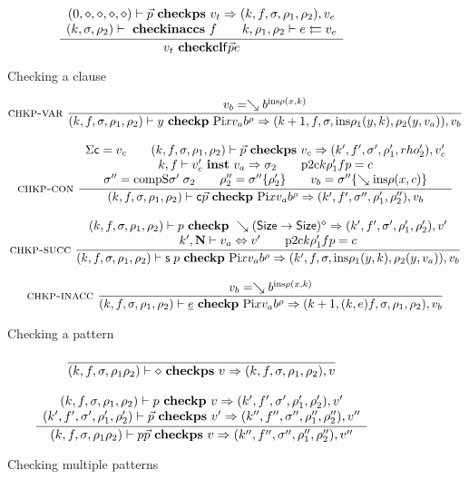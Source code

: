 \begin{figure}
\begin{gather*}
\ \dfrac{\begin{array}[b]{c}(0,\diamond,\diamond,\diamond,\diamond)\vdash\vec{p}\mbox{ \textbf{checkps} }v_t\Rightarrow (k,f,\sigma,\rho_1,\rho_2),v_e\\(k,\sigma,\rho_2)\vdash\mbox{ \textbf{checkinaccs} }f 
\qquad
k,\rho_1,\rho_2\vdash e\leftleftarrows v_e
\end{array}}{
v_t\mbox{ \textbf{checkcl}}\mathsf{f} \vec{p} e
}
\end{gather*}
\caption{Checking a clause}
\end{figure}

\begin{figure}
\begin{gather*}
\mbox{\sc chkp-var}\ \dfrac{v_b = \searrow b^{\mathrm{ins} \rho (x,k)}}{
(k,f,\sigma,\rho_1,\rho_2)\vdash y\mbox{ \textbf{checkp} }\mathrm{Pi} x v_a b^{\rho}\Rightarrow (k+1,f,\sigma,\mathrm{ins} \rho_1 (y,k),\rho_2 (y,v_a)),v_b}
\\[2ex]
\mbox{\sc chkp-con}\ \dfrac{\begin{array}[b]{c}\mathrm{\Sigma}{\mathsf{c}}=v_c \qquad
(k,f,\sigma,\rho_1,\rho_2)\vdash\vec{p}\mbox{ \textbf{checkps} }v_c\Rightarrow (k',f',\sigma',\rho'_1,rho'_2),v'_c
\\k,f\vdash v'_c\mbox{ \textbf{inst} }v_a\Rightarrow \sigma_2 \qquad
\mathrm{p2c} k \rho'_1 f p =  c\\\sigma'' = \mathrm{compS}\sigma'\;\sigma_2 \qquad
\rho''_2 = \sigma''\{\rho'_2\} \qquad
v_b = \sigma''\{\searrow \mathrm{ins} \rho (x,c)\}
\end{array}}{(k,f,\sigma,\rho_1,\rho_2)\vdash\mathsf{c} \vec{p}\mbox{ \textbf{checkp} }\mathrm{Pi} x v_a b^{\rho}\Rightarrow (k',f',\sigma'',\rho'_1,\rho''_2),v_b
}
\\[2ex]
\mbox{\sc chkp-succ}\ \dfrac{\begin{array}[b]{c}
(k,f,\sigma,\rho_1,\rho_2)\vdash p\mbox{ \textbf{checkp} }\searrow (\mathsf{Size} \rightarrow \mathsf{Size})^{\diamond}\Rightarrow (k',f',\sigma',\rho'_1,\rho'_2),v'\\
k',\mathbf{N}\vdash v_a\Leftrightarrow v' \qquad
\mathrm{p2c} k \rho'_1 f p = c
\end{array}}{
(k,f,\sigma,\rho_1,\rho_2)\vdash\mathsf{s}\; p\mbox{ \textbf{checkp} }\mathrm{Pi} x v_a b^{\rho}\Rightarrow (k',f,\sigma,\mathrm{ins} \rho_1 (y,k),\rho_2 (y,v_a)),v_b}
\\[2ex]
\mbox{\sc chkp-inacc}\ \dfrac{v_b = \searrow b^{\mathrm{ins} \rho (x,k)}}{
(k,f,\sigma,\rho_1,\rho_2)\vdash\underline{e}\mbox{ \textbf{checkp} }\mathrm{Pi} x v_a b^{\rho}\Rightarrow (k+1,(k,e)f,\sigma,\rho_1,\rho_2),v_b}
\end{gather*}
\caption{Checking a pattern}
\end{figure}

\begin{figure}
\begin{gather*}
\ \dfrac{}{
(k,f,\sigma,\rho_1\rho_2)\vdash\diamond\mbox{ \textbf{checkps} }v\Rightarrow (k,f,\sigma,\rho_1,\rho_2),v}
\\[2ex]
\ \dfrac{\begin{array}[b]{c}(k,f,\sigma,\rho_1,\rho_2)\vdash p\mbox{ \textbf{checkp} }v\Rightarrow (k',f',\sigma',\rho'_1,\rho'_2),v'
\\(k',f',\sigma',\rho'_1,\rho'_2)\vdash\vec{p}\mbox{ \textbf{checkps} }v'\Rightarrow (k'',f'',\sigma'',\rho''_1,\rho''_2),v''
\end{array}}{
(k,f,\sigma,\rho_1\rho_2)\vdash p \vec{p}\mbox{ \textbf{checkps} }v\Rightarrow (k'',f'',\sigma'',\rho''_1,\rho''_2),v''}
\end{gather*}
\caption{Checking multiple patterns}
\end{figure}

